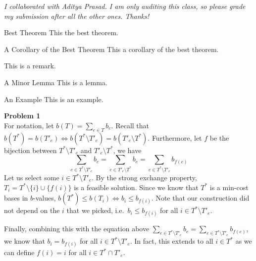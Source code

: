 \documentclass[a4paper]{/home/dawei/.dotfiles/templates/preamble}
\begin{document}
\textit{I collaborated with Aditya Prasad. I am only auditing this class, so
please grade my submission after all the other ones. Thanks!}

\begin{theorem}{Best Theorem}{}
  This the best theorem.
\end{theorem}

\begin{corollary}{A Corollary of the Best Theorem}{}
  This a corollary of the best theorem.
\end{corollary}

\begin{remark}{}{}
  This is a remark.
\end{remark}

\begin{lemma}{A Minor Lemma}{}
  This is a lemma.
\end{lemma}

\begin{example}{An Example}{}
  This is an example.
\end{example}

\noindent\textbf{Problem 1} \\
For notation, let $b(T) = \sum_{e \in T} b_e$. Recall that $b(T^*) = b(T'_e)
\iff b(T^* \setminus T'_e) = b(T'_e \setminus T^*)$. Furthermore, let $f$ be the bijection between $T^* \setminus T'_e$ and $T'_e \setminus T^*$,
we have
\[
  \sum_{e \in T^* \setminus T'_e} b_e = \sum_{e \in T'_e \setminus T^*} b_e = \sum_{e \in T^* \setminus T'_e} b_{f(e)}
\]
Let us select some $i \in T^* \setminus T'_e$. By the strong exchange property,
$T_i = T^* \setminus \{i\} \cup \{f(i)\}$ is a feasible solution. Since we know
that $T^*$ is a min-cost bases in $b$-values, $b(T^*) \le b(T_i) \iff b_i \le
b_{f(i)}$. Note that our construction did not depend on the $i$ that we picked,
i.e.\ $b_i \le b_{f(i)}$ for all $i \in T^* \setminus T'_e$.

Finally, combining this with the equation above $\sum_{e \in T^* \setminus
T'_e} b_e = \sum_{e \in T^* \setminus T'_e} b_{f(e)}$, we know that $b_i
= b_{f(i)}$ for all $i \in T^* \setminus T'_e$. In fact, this extends to all $i
\in T^*$ as we can define $f(i) = i$ for all $i \in T^* \cap T'_e$.
\end{document}
